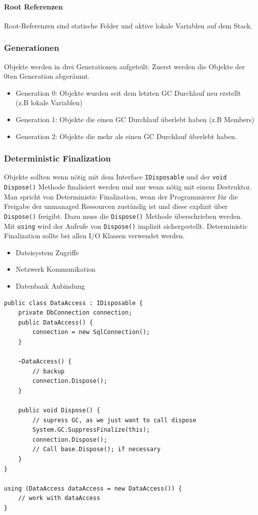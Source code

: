\documentclass[
a4paper,
oneside,
10pt,
fleqn,
headsepline,
toc=listofnumbered, 
bibliography=totocnumbered]{scrartcl}
\begin{document}
\paragraph{Root Referenzen}
Root-Referenzen sind statische Felder und aktive lokale Variablen auf dem Stack.

\subsubsection{Generationen}
Objekte werden in drei Generationen aufgeteilt: Zuerst werden die Objekte der 0ten Generation abgeräumt.
\begin{itemize}
	\item Generation 0: Objekte wurden seit dem letzten GC Durchlauf neu erstellt (z.B lokale Variablen)
	\item Generation 1: Objekte die einen GC Durchlauf überlebt haben (z.B Members)
	\item Generation 2: Objekte die mehr als einen GC Durchlauf überlebt haben.
\end{itemize}

\subsubsection{Deterministic Finalization} Objekte sollten wenn nötig mit dem Interface \lstinline|IDisposable| und der \lstinline|void Dispose()| Methode finalisiert werden und nur wenn nötig mit einem Destruktor. Man spricht von Deterministic Finalization, wenn der Programmierer für die Freigabe der unmanaged Ressourcen zuständig ist und diese explizit über \lstinline|Dispose()| freigibt. Dazu muss die \lstinline|Dispose()| Methode überschrieben werden. Mit \lstinline|using| wird der Aufrufe von \lstinline|Dispose()| implizit sichergestellt. Deterministic Finalization sollte bei allen I/O Klassen verwendet werden.
\begin{itemize}
	\item Dateisystem Zugriffe
	\item Netzwerk Kommunikation
	\item Datenbank Anbindung
\end{itemize}

\begin{lstlisting}
public class DataAccess : IDisposable {
	private DbConnection connection;
	public DataAccess() { 
		connection = new SqlConnection();
	}
	
	~DataAccess() {
		// backup
		connection.Dispose(); 
	}
	
	public void Dispose() {
		// supress GC, as we just want to call dispose
		System.GC.SuppressFinalize(this);
		connection.Dispose();
		// Call base.Dispose(); if necessary
	}
}

using (DataAccess dataAccess = new DataAccess()) {
	// work with dataAccess
}
\end{lstlisting}
\end{document}
